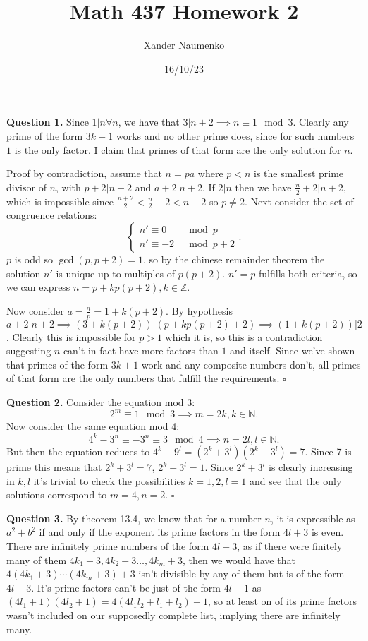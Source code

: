 \documentclass[letterpaper, reqno,11pt]{article}
\begin{document}
\title{Math 437 Homework 2}
\date{16/10/23}
\author{Xander Naumenko}
\maketitle

{\medskip\noindent\bf Question 1.} Since $1|n\forall n$, we have that $3|n+2\implies n\equiv 1\mod 3$. Clearly any prime of the form $3k+1$ works and no other prime does, since for such numbers $1$ is the only factor. I claim that primes of that form are the only solution for $n$. 

Proof by contradiction, assume that $n=pa$ where $p<n$ is the smallest prime divisor of $n$, with $p+2|n+2$ and $a+2|n+2$. If $2|n$ then we have $\frac{n}{2}+2|n+2$, which is impossible since $\frac{n+2}{2}<\frac{n}{2}+2<n+2$ so $p\neq 2$. Next consider the set of congruence relations:
\[
    \begin{cases}
        n'\equiv 0&\mod p\\
        n'\equiv -2&\mod p+2
    \end{cases}
.\]
$p$ is odd so $\gcd(p,p+2)=1$, so by the chinese remainder theorem the solution $n'$ is unique up to multiples of $p(p+2)$. $n'=p$ fulfills both criteria, so we can express $n=p+kp(p+2),k\in \mathbb{Z}$.

Now consider $a=\frac{n}{p}=1+k(p+2)$. By hypothesis $a+2|n+2\implies (3+k(p+2))|(p+kp(p+2)+2)\implies (1+k(p+2))|2$. Clearly this is impossible for $p>1$ which it is, so this is a contradiction suggesting $n$ can't in fact have more factors than $1$ and itself. Since we've shown that primes of the form $3k+1$ work and any composite numbers don't, all primes of that form are the only numbers that fulfill the requirements. $\square$

{\medskip\noindent\bf Question 2.} Consider the equation mod 3:
\[
2^{m}\equiv 1\mod 3\implies m=2k, k\in \mathbb{N}
.\]
Now consider the same equation mod 4:
\[
4^{k}-3^{n}\equiv -3^{n}\equiv 3\mod 4\implies n=2l, l\in \mathbb{N}
.\]
But then the equation reduces to $4^{k}-9^{l}=(2^{k}+3^{l})(2^{k}-3^{l})=7$. Since 7 is prime this means that $2^{k}+3^{l}=7$, $2^{k}-3^{l}=1$. Since $2^{k}+3^{l}$ is clearly increasing in $k,l$ it's trivial to check the possibilities $k=1,2,l=1$ and see that the only solutions correspond to $m=4,n=2$. $\square$

{\medskip\noindent\bf Question 3.} By theorem 13.4, we know that for a number $n$, it is expressible as $a^2+b^2$ if and only if the exponent its prime factors in the form $4l+3$ is even. There are infinitely prime numbers of the form $4l+3$, as if there were finitely many of them $4k_1+3,4k_2+3\ldots, 4k_m+3$, then we would have that $4(4k_1+3)\cdots (4k_m+3)+3$ isn't divisible by any of them but is of the form $4l+3$. It's prime factors can't be just of the form $4l+1$ as $(4l_1+1)(4l_2+1)=4(4l_1l_2+l_1+l_2)+1$, so at least on of its prime factors wasn't included on our supposedly complete list, implying there are infinitely many.
\end{document}
